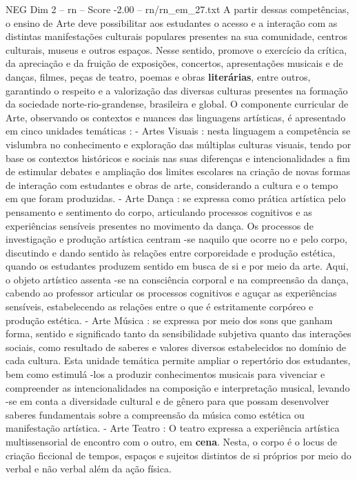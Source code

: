 \begin{textsample}{NEG Dim 2 – rn – Score -2.00 – rn/rn\_em\_27.txt}
A partir dessas competências, o ensino de Arte deve possibilitar aos estudantes o acesso e a interação com as distintas manifestações culturais populares presentes na sua comunidade, centros culturais, museus e outros espaços.
Nesse sentido, promove o exercício da crítica, da apreciação e da fruição de exposições, concertos, apresentações musicais e de danças, filmes, peças de teatro, poemas e obras \textbf{literárias}, entre outros, garantindo o respeito e a valorização das diversas culturas presentes na formação da sociedade norte-rio-grandense, brasileira e global.
O componente curricular de Arte, observando os contextos e nuances das linguagens artísticas, é apresentado em cinco unidades temáticas : - Artes Visuais : nesta linguagem a competência se vislumbra no conhecimento e exploração das múltiplas culturas visuais, tendo por base os contextos históricos e sociais nas suas diferenças e intencionalidades a fim de estimular debates e ampliação dos limites escolares na criação de novas formas de interação com estudantes e obras de arte, considerando a cultura e o tempo em que foram produzidas. - Arte Dança : se expressa como prática artística pelo pensamento e sentimento do corpo, articulando processos cognitivos e as experiências sensíveis presentes no movimento da dança.
Os processos de investigação e produção artística centram -se naquilo que ocorre no e pelo corpo, discutindo e dando sentido às relações entre corporeidade e produção estética, quando os estudantes produzem sentido em busca de si e por meio da arte.
Aqui, o objeto artístico assenta -se na consciência corporal e na compreensão da dança, cabendo ao professor articular os processos cognitivos e aguçar as experiências sensíveis, estabelecendo as relações entre o que é estritamente corpóreo e produção estética. - Arte Música : se expressa por meio dos sons que ganham forma, sentido e significado tanto da sensibilidade subjetiva quanto das interações sociais, como resultado de saberes e valores diversos estabelecidos no domínio de cada cultura.
Esta unidade temática permite ampliar o repertório dos estudantes, bem como estimulá -los a produzir conhecimentos musicais para vivenciar e compreender as intencionalidades na composição e interpretação musical, levando -se em conta a diversidade cultural e de gênero para que possam desenvolver saberes fundamentais sobre a compreensão da música como estética ou manifestação artística. - Arte Teatro : O teatro expressa a experiência artística multissensorial de encontro com o outro, em \textbf{cena}.
Nesta, o corpo é o locus de criação ficcional de tempos, espaços e sujeitos distintos de si próprios por meio do verbal e não verbal além da ação física.

\end{textsample}
